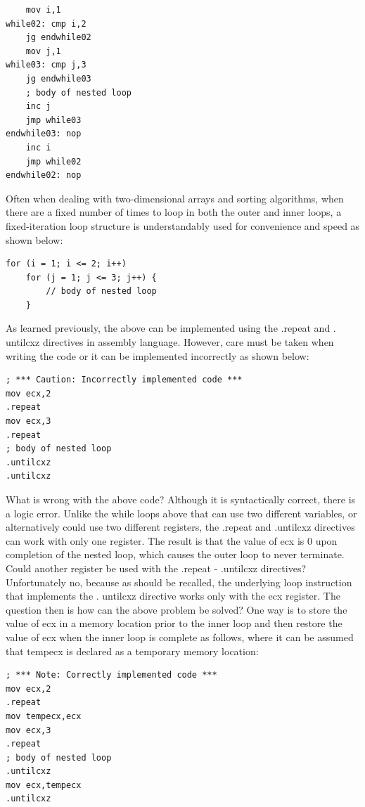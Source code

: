\documentclass[10pt]{article}
\begin{document}
\begin{verbatim}
    mov i,1
while02: cmp i,2
    jg endwhile02
    mov j,1
while03: cmp j,3
    jg endwhile03
    ; body of nested loop
    inc j
    jmp while03
endwhile03: nop
    inc i
    jmp while02
endwhile02: nop
\end{verbatim}

Often when dealing with two-dimensional arrays and sorting algorithms, when there are a fixed number of times to loop in both the outer and inner loops, a fixed-iteration loop structure is understandably used for convenience and speed as shown below:

\begin{verbatim}
for (i = 1; i <= 2; i++)
    for (j = 1; j <= 3; j++) {
        // body of nested loop
    }
\end{verbatim}

As learned previously, the above can be implemented using the .repeat and . untilcxz directives in assembly language. However, care must be taken when writing the code or it can be implemented incorrectly as shown below:

\begin{verbatim}
; *** Caution: Incorrectly implemented code ***
mov ecx,2
.repeat
mov ecx,3
.repeat
; body of nested loop
.untilcxz
.untilcxz
\end{verbatim}

What is wrong with the above code? Although it is syntactically correct, there is a logic error. Unlike the while loops above that can use two different variables, or alternatively could use two different registers, the .repeat and .untilcxz directives can work with only one register. The result is that the value of ecx is 0 upon completion of the nested loop, which causes the outer loop to never terminate. Could another register be used with the .repeat - .untilcxz directives? Unfortunately no, because as should be recalled, the underlying loop instruction that implements the . untilcxz directive works only with the ecx register. The question then is how can the above problem be solved? One way is to store the\\
value of ecx in a memory location prior to the inner loop and then restore the value of ecx when the inner loop is complete as follows, where it can be assumed that tempecx is declared as a temporary memory location:

\begin{verbatim}
; *** Note: Correctly implemented code ***
mov ecx,2
.repeat
mov tempecx,ecx
mov ecx,3
.repeat
; body of nested loop
.untilcxz
mov ecx,tempecx
.untilcxz
\end{verbatim}
\end{document}
